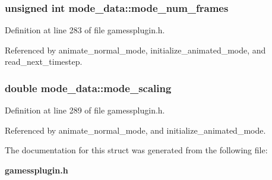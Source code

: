 \subsubsection{\setlength{\rightskip}{0pt plus 5cm}unsigned int mode\_\-data::mode\_\-num\_\-frames}\label{structmode__data_m1}




Definition at line 283 of file gamessplugin.h.

Referenced by animate\_\-normal\_\-mode, initialize\_\-animated\_\-mode, and read\_\-next\_\-timestep.
\subsubsection{\setlength{\rightskip}{0pt plus 5cm}double mode\_\-data::mode\_\-scaling}\label{structmode__data_m3}




Definition at line 289 of file gamessplugin.h.

Referenced by animate\_\-normal\_\-mode, and initialize\_\-animated\_\-mode.

The documentation for this struct was generated from the following file:\begin{CompactItemize}
\item 
{\bf gamessplugin.h}\end{CompactItemize}
